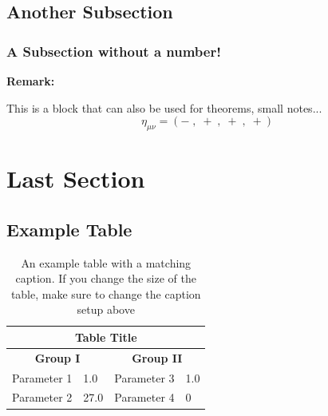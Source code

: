 \subsection{Another Subsection}

\lipsum[1]

\subsubsection*{A Subsection without a number!}


\lipsum[3]

\begin{shaded}
	\textbf{Remark:}
	
	This is a block that can also be used for theorems, small notes...
	\begin{equation}
	\eta_{\mu \nu} = ( - \;,\; + \;,\; + \;,\; +)
	\end{equation}
	
\end{shaded}

\lipsum[3]

\section{Last Section}

\lipsum[2]


\subsection{Example Table}
\lipsum[7]
%

\begin{table}[h]
\begin{center}
	\begin{tabular}{ ||p{3cm}|p{3cm}||p{3cm}|p{3cm}||  }
		\hline
		\multicolumn{4}{|c|}{\textbf{Table Title}} \\
		\hline
		\multicolumn{2}{||c||}{\textbf{Group I}} & \multicolumn{2}{c||}{\textbf{Group II}} \\
		\hline
		Parameter 1   	& 	1.0    	& Parameter 3		&   1.0	\\
		Parameter 2   	& 	27.0  	& Parameter 4   	&	0  	\\
		\hline
	\end{tabular}
  \captionsetup{width=14cm}

\caption{ An example table with a matching caption. If you change the size of the table, make sure to change the caption setup above }\label{tab:noPublications}
\end{center}
\end{table}

